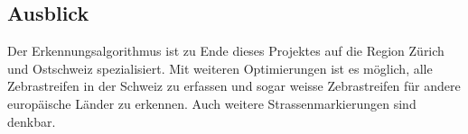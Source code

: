 \subsection*{Ausblick}
Der Erkennungsalgorithmus ist zu Ende dieses Projektes auf die Region Zürich und Ostschweiz spezialisiert. Mit weiteren Optimierungen ist es möglich, alle Zebrastreifen in der Schweiz zu erfassen und sogar weisse Zebrastreifen für andere europäische Länder zu erkennen. Auch weitere Strassenmarkierungen sind denkbar.
\newpage